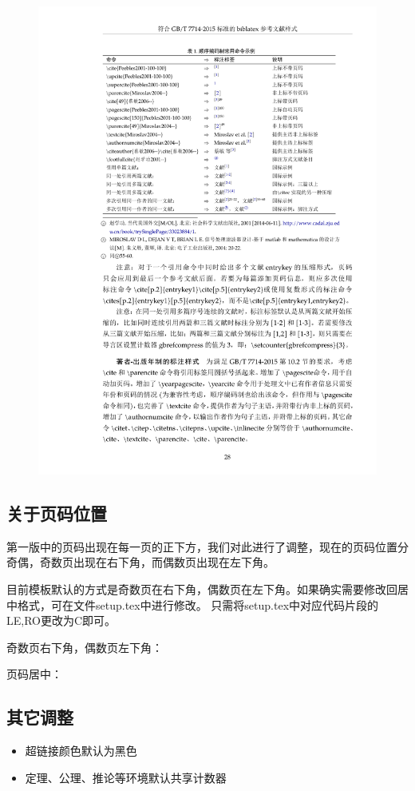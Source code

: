 \begin{figure}
    \centering
    \includegraphics[width=0.8\linewidth]{figs/biblatex-gb7714-2015.pdf}
\end{figure}

\subsection{关于页码位置}

第一版中的页码出现在每一页的正下方，我们对此进行了调整，现在的页码位置分奇偶，奇数页出现在右下角，而偶数页出现在左下角。

目前模板默认的方式是奇数页在右下角，偶数页在左下角。如果确实需要修改回居中格式，可在文件setup.tex中进行修改。
只需将setup.tex中对应代码片段的LE,RO更改为C即可。

奇数页右下角，偶数页左下角：
\begin{codeblock}
\fancyfoot{}
\fancyfoot[EL,OR]{\small\thepage}
\end{codeblock}

页码居中：
\begin{codeblock}
\fancyfoot{}
\fancyfoot[C]{\small\thepage}
\end{codeblock}

\subsection{其它调整}
\begin{itemize}
    \item 超链接颜色默认为黑色
    \item 定理、公理、推论等环境默认共享计数器
\end{itemize}
